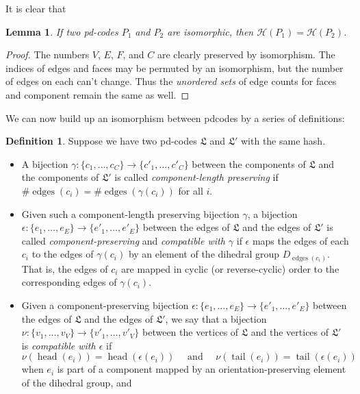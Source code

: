 \documentclass[amsmath,secnumarabic,floatfix,amssymb,nofootinbib,nobibnotes,letterpaper,11pt,tightenlines,showkeys]{revtex4}
\newtheorem{lemma}[theorem]{Lemma}
\theoremstyle{definition}
\newtheorem{definition}[theorem]{Definition}
\newcommand{\pdcodes}{pd-codes }
\newcommand{\edges}{\operatorname{edges}}
\newcommand{\head}{\operatorname{head}}
\newcommand{\tail}{\operatorname{tail}}
\begin{document}
It is clear that
\begin{lemma}
If two \pdcodes $P_1$ and $P_2$ are isomorphic, then $\mathcal{H}(P_1) = \mathcal{H}(P_2)$.
\end{lemma}

\begin{proof}
The numbers $V$, $E$, $F$, and $C$ are clearly preserved by isomorphism. The indices of edges and faces may be permuted by an isomorphism, but the number of edges on each can't change. Thus the \emph{unordered sets} of edge counts for faces and component remain the same as well.
\end{proof}

We can now build up an isomorphism between pdcodes by a series of definitions:

\begin{definition}
Suppose we have two pd-codes $\mathfrak{L}$ and $\mathfrak{L}'$ with the same hash.
\begin{itemize}
\item A bijection $\gamma: \{c_1,\dots,c_C\} \rightarrow \{c'_1,\dots,c'_C\}$ between the components of $\mathfrak{L}$ and the components of $\mathfrak{L}'$ is called \emph{component-length preserving} if $\# \edges(c_i) = \# \edges(\gamma(c_i))$ for all $i$.
\item Given such a component-length preserving bijection $\gamma$, a bijection $\epsilon : \{e_1,\dots,e_E\} \rightarrow \{e'_1,\dots,e'_E\}$ between the edges of $\mathfrak{L}$ and the edges of $\mathfrak{L}'$ is called \emph{component-preserving} and \emph{compatible with $\gamma$} if $\epsilon$ maps the edges of each $c_i$ to the edges of $\gamma(c_i)$ by an element of the dihedral group $D_{\edges(c_i)}$. That is, the edges of $c_i$ are mapped in cyclic (or reverse-cyclic) order to the corresponding edges of $\gamma(c_i)$.
\item Given a component-preserving bijection $\epsilon : \{e_1,\dots,e_E\} \rightarrow \{e'_1,\dots,e'_E\}$ between the edges of $\mathfrak{L}$ and the edges of $\mathfrak{L}'$, we say that a bijection $\nu : \{v_1, \dots, v_V\} \rightarrow \{v'_1,\dots,v'_V\}$ between the vertices of $\mathfrak{L}$ and the vertices of $\mathfrak{L}'$ is \emph{compatible with $\epsilon$} if
\begin{equation*}
\nu(\head(e_i)) = \head(\epsilon(e_i)) \quad \text{ and } \quad \nu(\tail(e_i)) = \tail(\epsilon(e_i))
\end{equation*}
when $e_i$ is part of a component mapped by an orientation-preserving element of the dihedral group, and

\end{itemize}
\end{definition}
\end{document}
